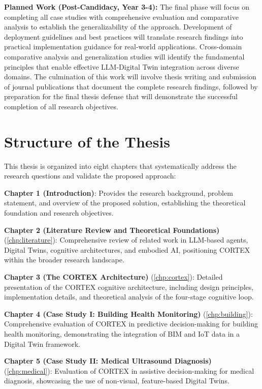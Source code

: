 \textbf{Planned Work (Post-Candidacy, Year 3-4):} The final phase will focus on completing all case studies with comprehensive evaluation and comparative analysis to establish the generalizability of the approach. Development of deployment guidelines and best practices will translate research findings into practical implementation guidance for real-world applications. Cross-domain comparative analysis and generalization studies will identify the fundamental principles that enable effective LLM-Digital Twin integration across diverse domains. The culmination of this work will involve thesis writing and submission of journal publications that document the complete research findings, followed by preparation for the final thesis defense that will demonstrate the successful completion of all research objectives.

\section{Structure of the Thesis}

This thesis is organized into eight chapters that systematically address the research questions and validate the proposed approach:

\textbf{Chapter 1 (Introduction)}: Provides the research background, problem statement, and overview of the proposed solution, establishing the theoretical foundation and research objectives.

\textbf{Chapter 2 (Literature Review and Theoretical Foundations)} (\autoref{chp:literature}): Comprehensive review of related work in LLM-based agents, Digital Twins, cognitive architectures, and embodied AI, positioning CORTEX within the broader research landscape.

\textbf{Chapter 3 (The CORTEX Architecture)} (\autoref{chp:cortex}): Detailed presentation of the CORTEX cognitive architecture, including design principles, implementation details, and theoretical analysis of the four-stage cognitive loop.

\textbf{Chapter 4 (Case Study I: Building Health Monitoring)} (\autoref{chp:building}): Comprehensive evaluation of CORTEX in predictive decision-making for building health monitoring, demonstrating the integration of BIM and IoT data in a Digital Twin framework.

\textbf{Chapter 5 (Case Study II: Medical Ultrasound Diagnosis)} (\autoref{chp:medical}): Evaluation of CORTEX in assistive decision-making for medical diagnosis, showcasing the use of non-visual, feature-based Digital Twins.

